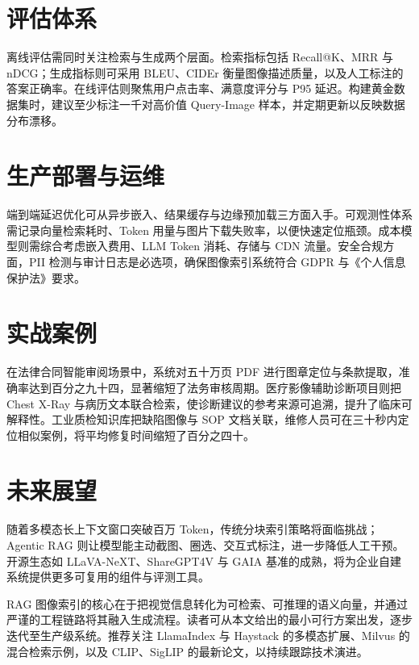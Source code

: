 \chapter{评估体系}
离线评估需同时关注检索与生成两个层面。检索指标包括 Recall@K、MRR 与 nDCG；生成指标则可采用 BLEU、CIDEr 衡量图像描述质量，以及人工标注的答案正确率。在线评估则聚焦用户点击率、满意度评分与 P95 延迟。构建黄金数据集时，建议至少标注一千对高价值 Query-Image 样本，并定期更新以反映数据分布漂移。\par
\chapter{生产部署与运维}
端到端延迟优化可从异步嵌入、结果缓存与边缘预加载三方面入手。可观测性体系需记录向量检索耗时、Token 用量与图片下载失败率，以便快速定位瓶颈。成本模型则需综合考虑嵌入费用、LLM Token 消耗、存储与 CDN 流量。安全合规方面，PII 检测与审计日志是必选项，确保图像索引系统符合 GDPR 与《个人信息保护法》要求。\par
\chapter{实战案例}
在法律合同智能审阅场景中，系统对五十万页 PDF 进行图章定位与条款提取，准确率达到百分之九十四，显著缩短了法务审核周期。医疗影像辅助诊断项目则把 Chest X-Ray 与病历文本联合检索，使诊断建议的参考来源可追溯，提升了临床可解释性。工业质检知识库把缺陷图像与 SOP 文档关联，维修人员可在三十秒内定位相似案例，将平均修复时间缩短了百分之四十。\par
\chapter{未来展望}
随着多模态长上下文窗口突破百万 Token，传统分块索引策略将面临挑战；Agentic RAG 则让模型能主动截图、圈选、交互式标注，进一步降低人工干预。开源生态如 LLaVA-NeXT、ShareGPT4V 与 GAIA 基准的成熟，将为企业自建系统提供更多可复用的组件与评测工具。\par
RAG 图像索引的核心在于把视觉信息转化为可检索、可推理的语义向量，并通过严谨的工程链路将其融入生成流程。读者可从本文给出的最小可行方案出发，逐步迭代至生产级系统。推荐关注 LlamaIndex 与 Haystack 的多模态扩展、Milvus 的混合检索示例，以及 CLIP、SigLIP 的最新论文，以持续跟踪技术演进。\par
